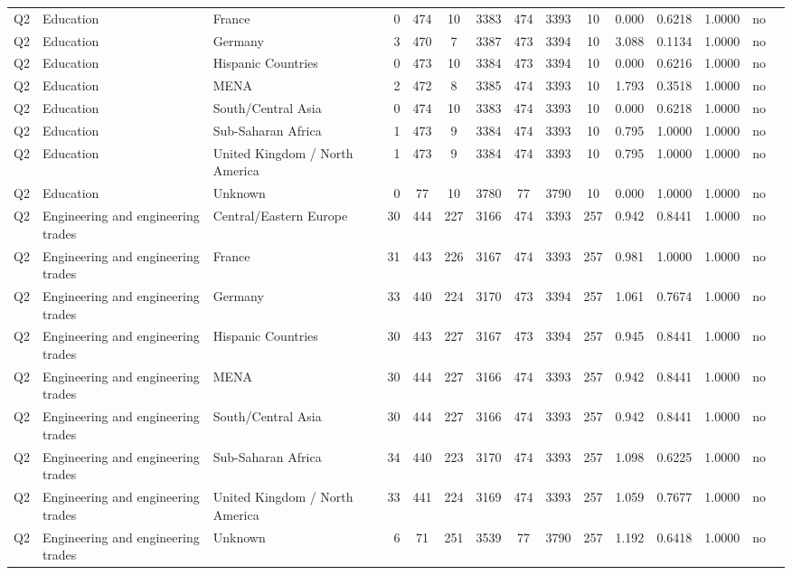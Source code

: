 \begin{longtable}{lllrcccccccccll}
Q2 & Education & France & 0 & 474 & 10 & 3383 & 474 & 3393 & 10 & 0.000 & 0.6218 & 1.0000 & no \\
Q2 & Education & Germany & 3 & 470 & 7 & 3387 & 473 & 3394 & 10 & 3.088 & 0.1134 & 1.0000 & no \\
Q2 & Education & Hispanic Countries & 0 & 473 & 10 & 3384 & 473 & 3394 & 10 & 0.000 & 0.6216 & 1.0000 & no \\
Q2 & Education & MENA & 2 & 472 & 8 & 3385 & 474 & 3393 & 10 & 1.793 & 0.3518 & 1.0000 & no \\
Q2 & Education & South/Central Asia & 0 & 474 & 10 & 3383 & 474 & 3393 & 10 & 0.000 & 0.6218 & 1.0000 & no \\
Q2 & Education & Sub-Saharan Africa & 1 & 473 & 9 & 3384 & 474 & 3393 & 10 & 0.795 & 1.0000 & 1.0000 & no \\
Q2 & Education & United Kingdom / North America & 1 & 473 & 9 & 3384 & 474 & 3393 & 10 & 0.795 & 1.0000 & 1.0000 & no \\
Q2 & Education & Unknown & 0 & 77 & 10 & 3780 & 77 & 3790 & 10 & 0.000 & 1.0000 & 1.0000 & no \\
Q2 & Engineering and engineering trades & Central/Eastern Europe & 30 & 444 & 227 & 3166 & 474 & 3393 & 257 & 0.942 & 0.8441 & 1.0000 & no \\
Q2 & Engineering and engineering trades & France & 31 & 443 & 226 & 3167 & 474 & 3393 & 257 & 0.981 & 1.0000 & 1.0000 & no \\
Q2 & Engineering and engineering trades & Germany & 33 & 440 & 224 & 3170 & 473 & 3394 & 257 & 1.061 & 0.7674 & 1.0000 & no \\
Q2 & Engineering and engineering trades & Hispanic Countries & 30 & 443 & 227 & 3167 & 473 & 3394 & 257 & 0.945 & 0.8441 & 1.0000 & no \\
Q2 & Engineering and engineering trades & MENA & 30 & 444 & 227 & 3166 & 474 & 3393 & 257 & 0.942 & 0.8441 & 1.0000 & no \\
Q2 & Engineering and engineering trades & South/Central Asia & 30 & 444 & 227 & 3166 & 474 & 3393 & 257 & 0.942 & 0.8441 & 1.0000 & no \\
Q2 & Engineering and engineering trades & Sub-Saharan Africa & 34 & 440 & 223 & 3170 & 474 & 3393 & 257 & 1.098 & 0.6225 & 1.0000 & no \\
Q2 & Engineering and engineering trades & United Kingdom / North America & 33 & 441 & 224 & 3169 & 474 & 3393 & 257 & 1.059 & 0.7677 & 1.0000 & no \\
Q2 & Engineering and engineering trades & Unknown & 6 & 71 & 251 & 3539 & 77 & 3790 & 257 & 1.192 & 0.6418 & 1.0000 & no \\

\end{longtable}
